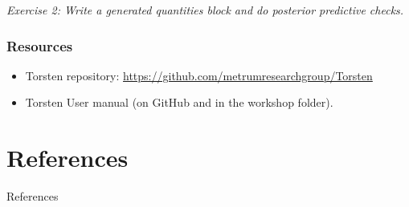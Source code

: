 \documentclass[xcolor=table]{beamer}
\begin{document}
\begin{frame}

  \textit{\textcolor{MRGGreen}{Exercise 2}:
     Write a generated quantities block and do posterior predictive checks.}
\end{frame}

\begin{frame}
  \frametitle{Resources}

  \begin{itemize}
    \item Torsten repository: \url{https://github.com/metrumresearchgroup/Torsten}
    \item Torsten User manual (on GitHub and in the workshop folder).
  \end{itemize}
\end{frame}

\section{References}
\begin{frame}[allowframebreaks]{References}
\scriptsize
% 
%

  
\end{frame}
\end{document}
